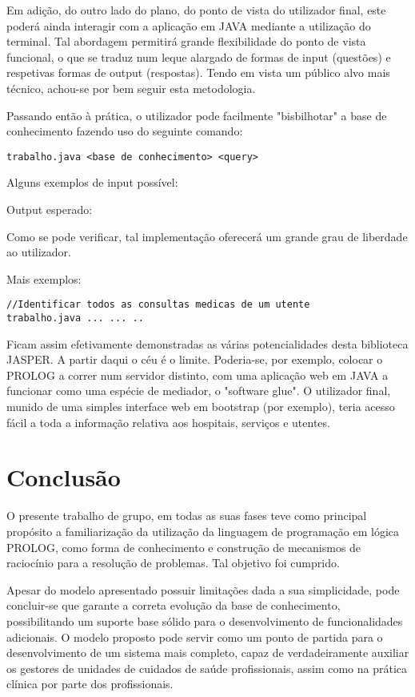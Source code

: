 \documentclass[
  oneside,
  10pt, a4paper,
  footinclude=true,
  headinclude=true,
  cleardoublepage=empty
]{scrbook}
\begin{document}
Em adição, do outro lado do plano, do ponto de vista do utilizador final, este poderá ainda interagir com a aplicação em JAVA  mediante a utilização do terminal. Tal abordagem permitirá grande flexibilidade do ponto de vista funcional, o que se traduz num leque alargado de formas de input (questões) e respetivas formas de output (respostas). Tendo em vista um público alvo mais técnico, achou-se por bem seguir esta metodologia.
\par
Passando então à prática, o utilizador pode facilmente "bisbilhotar" a base de conhecimento fazendo uso do seguinte comando:\par

\begin{lstlisting}
trabalho.java <base de conhecimento> <query>
\end{lstlisting}
Alguns exemplos de input possível:
\par
Output esperado:
\par
Como se pode verificar, tal implementação oferecerá um grande grau de liberdade ao utilizador.
\par
Mais exemplos:
\par
\begin{lstlisting}
//Identificar todos as consultas medicas de um utente
trabalho.java ... ... ..
\end{lstlisting}

Ficam assim efetivamente demonstradas as várias potencialidades desta biblioteca JASPER. A partir daqui o céu é o limite. Poderia-se, por exemplo, colocar o PROLOG a correr num servidor distinto, com uma aplicação web em JAVA a funcionar como uma espécie de mediador, o "software glue". O utilizador final, munido de uma simples interface web em bootstrap (por exemplo), teria acesso fácil a toda a informação relativa aos hospitais, serviços e utentes.

\par
	\chapter{Conclusão}
	
	
	
	O presente trabalho de grupo, em todas as suas fases teve como principal propósito a familiarização da utilização da linguagem de programação em lógica PROLOG, como forma de conhecimento e construção de
mecanismos de raciocínio para a resolução de problemas. Tal objetivo foi cumprido.\par 
		Apesar do modelo apresentado possuir limitações dada a sua simplicidade, pode concluir-se que garante a correta evolução da base de conhecimento, possibilitando um suporte base sólido para o desenvolvimento de funcionalidades adicionais. 
		O modelo proposto pode servir como um ponto de partida para o 
desenvolvimento de um sistema mais completo, capaz de verdadeiramente auxiliar os gestores de unidades de cuidados de saúde profissionais, assim como na prática clínica por parte dos profissionais.
			
\end{document}
